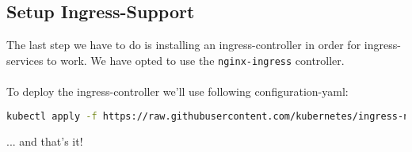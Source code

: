 \subsection{Setup Ingress-Support}
The last step we have to do is installing an ingress-controller in order for ingress-services to work. We have opted to use the \texttt{nginx-ingress} controller.\\\\To deploy the ingress-controller we'll use following configuration-yaml:
\begin{lstlisting}[language=bash,caption=Deploy nginx-ingress as ingress-controller] 
kubectl apply -f https://raw.githubusercontent.com/kubernetes/ingress-nginx/controller-v1.5.1/deploy/static/provider/cloud/deploy.yaml
\end{lstlisting}
\vspace{2cm}
\begin{center}
    \Large{... and that's it!}    
\end{center}

